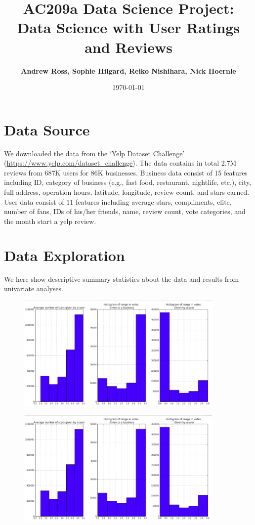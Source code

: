 \documentclass[11pt]{article}
\title{
\vspace{1cm}
\textmd{\textbf{AC209a Data Science Project: Data Science with User Ratings and Reviews}}\\
}
\author{\textbf{Andrew Ross, Sophie Hilgard, Reiko Nishihara, Nick Hoernle}}
\date{\today} %
\begin{document}
\maketitle

\section*{Data Source}
We downloaded the data from the `Yelp Dataset Challenge' (\url{https://www.yelp.com/dataset_challenge}). The data contains in total 2.7M reviews from 687K users for 86K businesses. Business data consist of 15 features including ID, category of business (e.g., fast food, restaurant, nightlife, etc.), city, full address, operation hours, latitude, longitude, review count, and stars earned. User data consist of 11 features including average stars, compliments, elite, number of fans, IDs of his/her friends, name, review count, vote categories, and the month start a yelp review. 

\section*{Data Exploration}
We here show descriptive summary statistics about the data and results from univariate analyses. 

\begin{figure}[!htb]
\centering
\includegraphics[width=0.9\textwidth]{./ac209/avgstarsusersbusinesses.png}
\end{figure}

\begin{figure}[!htb]
\centering
\includegraphics[width=0.9\textwidth]{./ac209/avgstarsusersbusinesses.png}
\end{figure}
\end{document}
